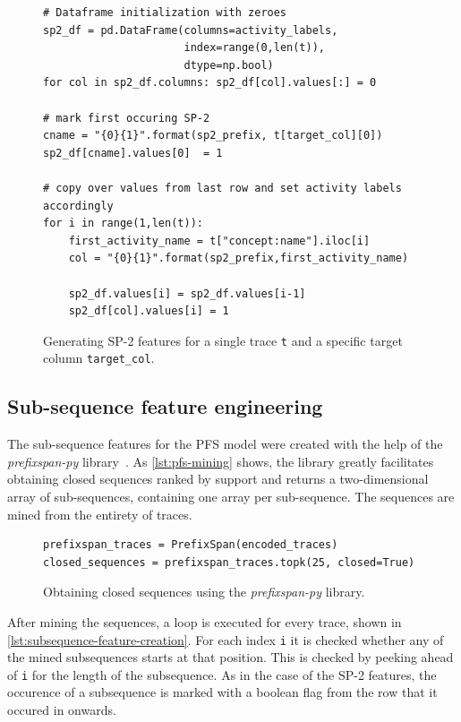 \begin{figure}
\begin{verbatim}
# Dataframe initialization with zeroes
sp2_df = pd.DataFrame(columns=activity_labels,
                      index=range(0,len(t)),
                      dtype=np.bool)
for col in sp2_df.columns: sp2_df[col].values[:] = 0

# mark first occuring SP-2 
cname = "{0}{1}".format(sp2_prefix, t[target_col][0])
sp2_df[cname].values[0]  = 1

# copy over values from last row and set activity labels accordingly
for i in range(1,len(t)):
    first_activity_name = t["concept:name"].iloc[i]
    col = "{0}{1}".format(sp2_prefix,first_activity_name)
    
    sp2_df.values[i] = sp2_df.values[i-1]
    sp2_df[col].values[i] = 1
\end{verbatim}
\caption{Generating SP-2 features for a single trace \texttt{t} and a specific target column \texttt{target\_col}.}
\label{lst:sp2-generation}
\end{figure}

\subsection*{Sub-sequence feature engineering}
The sub-sequence features for the PFS model were created with the help of the \textit{prefixspan-py} library~\cite{web:prefixspan-py}. As \autoref{lst:pfs-mining} shows, the library greatly facilitates obtaining closed sequences ranked by support and returns a two-dimensional array of sub-sequences, containing one array per sub-sequence. The sequences are mined from the entirety of traces.

\begin{figure}
\begin{verbatim}
prefixspan_traces = PrefixSpan(encoded_traces)
closed_sequences = prefixspan_traces.topk(25, closed=True)
\end{verbatim}
\caption{Obtaining closed sequences using the \textit{prefixspan-py} library.}
\label{lst:pfs-mining}
\end{figure}

After mining the sequences, a loop is executed for every trace, shown in \autoref{lst:subsequence-feature-creation}. For each index \verb=i= it is checked whether any of the mined subsequences starts at that position. This is checked by peeking ahead of \verb=i= for the length of the subsequence. As in the case of the SP-2 features, the occurence of a subsequence is marked with a boolean flag from the row that it occured in onwards.

